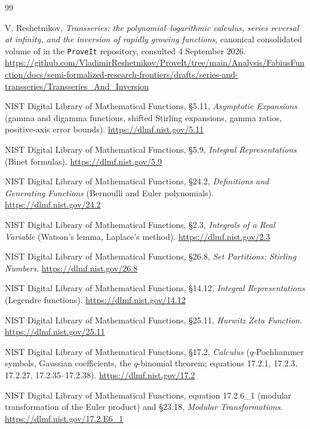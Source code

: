 \documentclass[11pt,openany]{book}
\numberwithin{equation}{chapter}
\theoremstyle{plain}
\theoremstyle{definition}
\theoremstyle{remark}
\begin{document}
\backmatter
\begin{thebibliography}{99}
\small
\setlength{\itemsep}{0.25em}

V. Reshetnikov, \emph{Transseries: the polynomial--logarithmic calculus,
series reversal at infinity, and the inversion of rapidly growing
functions}, canonical consolidated volume of
 in the
\texttt{ProveIt} repository, consulted 4 September 2026.
\url{https://github.com/VladimirReshetnikov/ProveIt/tree/main/Analysis/FabiusFunction/docs/semi-formalized-research-frontiers/drafts/series-and-transseries/Transseries_And_Inversion}

NIST Digital Library of Mathematical Functions, \S5.11, \emph{Asymptotic Expansions} (gamma and digamma functions, shifted Stirling expansions, gamma ratios, positive-axis error bounds). \url{https://dlmf.nist.gov/5.11}

NIST Digital Library of Mathematical Functions, \S5.9, \emph{Integral Representations} (Binet formulas). \url{https://dlmf.nist.gov/5.9}

NIST Digital Library of Mathematical Functions, \S24.2, \emph{Definitions and Generating Functions} (Bernoulli and Euler polynomials). \url{https://dlmf.nist.gov/24.2}

NIST Digital Library of Mathematical Functions, \S2.3, \emph{Integrals of a Real Variable} (Watson's lemma, Laplace's method). \url{https://dlmf.nist.gov/2.3}

NIST Digital Library of Mathematical Functions, \S26.8, \emph{Set Partitions: Stirling Numbers}. \url{https://dlmf.nist.gov/26.8}

NIST Digital Library of Mathematical Functions, \S14.12, \emph{Integral Representations} (Legendre functions). \url{https://dlmf.nist.gov/14.12}

NIST Digital Library of Mathematical Functions, \S25.11, \emph{Hurwitz Zeta Function}. \url{https://dlmf.nist.gov/25.11}

NIST Digital Library of Mathematical Functions, \S17.2, \emph{Calculus} ($q$-Pochhammer symbols, Gaussian coefficients, the $q$-binomial theorem; equations 17.2.1, 17.2.3, 17.2.27, 17.2.35--17.2.38). \url{https://dlmf.nist.gov/17.2}

NIST Digital Library of Mathematical Functions, equation 17.2.6\_1 (modular transformation of the Euler product) and \S23.18, \emph{Modular Transformations}. \url{https://dlmf.nist.gov/17.2.E6_1}


\end{thebibliography}
\end{document}
